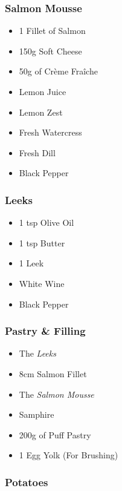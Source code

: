 \documentclass[11pt, english]{article}
\begin{document}
		\subsubsection*{Salmon Mousse}

	\begin{itemize}
        \setlength\itemsep{0cm}
                \item 1 Fillet of Salmon
		\item 150g Soft Cheese
		\item 50g of Cr\`{e}me Fra\^{i}che
		\item Lemon Juice
		\item Lemon Zest
		\item Fresh Watercress
		\item Fresh Dill
		\item Black Pepper
        \end{itemize}

		\subsubsection*{Leeks}

	\begin{itemize}
        \setlength\itemsep{0cm}
		\item 1 tsp Olive Oil
		\item 1 tsp Butter
		\item 1 Leek
		\item White Wine
		\item Black Pepper
        \end{itemize}

		\subsubsection*{Pastry \& Filling}

	\begin{itemize}
        \setlength\itemsep{0cm}
		\item The \textit{Leeks}
		\item 8cm Salmon Fillet
		\item The \textit{Salmon Mousse}
		\item Samphire
		\item 200g of Puff Pastry
		\item 1 Egg Yolk (For Brushing)
        \end{itemize}

		\subsubsection*{Potatoes}
\end{document}
